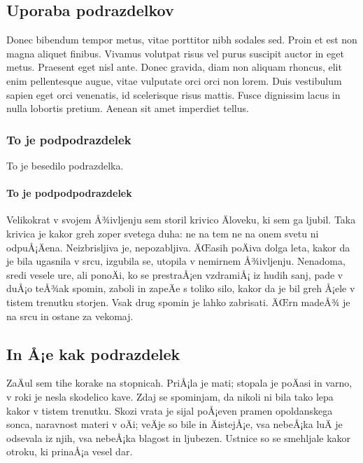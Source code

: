\documentclass[a4paper]{article}
\begin{document}
\subsection{Uporaba podrazdelkov}

Donec bibendum tempor metus, vitae porttitor nibh sodales sed. Proin et est non magna
aliquet finibus. Vivamus volutpat risus vel purus suscipit auctor in eget metus. Praesent
eget nisl ante. Donec gravida, diam non aliquam rhoncus, elit enim pellentesque augue,
vitae vulputate orci orci non lorem. Duis vestibulum sapien eget orci venenatis, id
scelerisque risus mattis. Fusce dignissim lacus in nulla lobortis pretium. Aenean sit amet
imperdiet tellus.

\subsubsection{To je podpodrazdelek}

To je besedilo podrazdelka.

\paragraph{To je podpodpodrazdelek}

Velikokrat v svojem Å¾ivljenju sem storil krivico Äloveku, ki sem ga ljubil. Taka krivica
je kakor greh zoper svetega duha: ne na tem ne na onem svetu ni odpuÅ¡Äena. Neizbrisljiva
je, nepozabljiva. ÄŒasih poÄiva dolga leta, kakor da je bila ugasnila v srcu, izgubila se,
utopila v nemirnem Å¾ivljenju. Nenadoma, sredi vesele ure, ali ponoÄi, ko se prestraÅ¡en
vzdramiÅ¡ iz hudih sanj, pade v duÅ¡o teÅ¾ak spomin, zaboli in zapeÄe s toliko silo, kakor da
je bil greh Å¡ele v tistem trenutku storjen. Vsak drug spomin je lahko zabrisati. ÄŒrn madeÅ¾
je na srcu in ostane za vekomaj.

\subsection{In Å¡e kak podrazdelek}

ZaÄul sem tihe korake na stopnicah. PriÅ¡la je mati; stopala je poÄasi in varno, v roki je
nesla skodelico kave. Zdaj se spominjam, da nikoli ni bila tako lepa kakor v tistem
trenutku. Skozi vrata je sijal poÅ¡even pramen opoldanskega sonca, naravnost materi v oÄi;
veÄje so bile in ÄistejÅ¡e, vsa nebeÅ¡ka luÄ je odsevala iz njih, vsa nebeÅ¡ka blagost in
ljubezen. Ustnice so se smehljale kakor otroku, ki prinaÅ¡a vesel dar.
\end{document}
